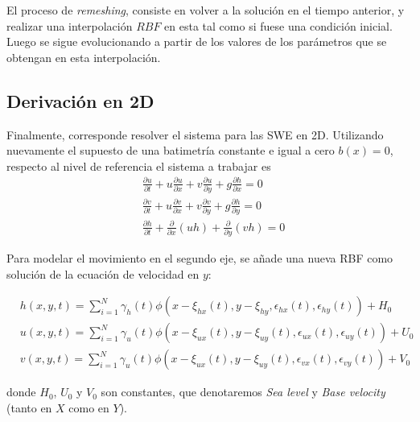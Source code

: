 ﻿\documentclass[spanish]{article}
\begin{document}
    El proceso de \textit{remeshing}, consiste en volver a la solución en el tiempo anterior, y realizar una interpolación $RBF$ en esta tal como si fuese una condición inicial. Luego se sigue evolucionando a partir de los valores de los parámetros que se obtengan en esta interpolación.


\subsection{Derivación en 2D}

    Finalmente, corresponde resolver el sistema para las SWE en 2D. Utilizando nuevamente el supuesto de una batimetría constante e igual a cero $b(x)=0$, respecto al nivel de referencia el sistema a trabajar es
\begin{align}
 & \frac{\partial u}{\partial t} + u \frac{\partial u}{\partial x} + v \frac{\partial u}{\partial y} + g \frac{\partial h}{\partial x} = 0 \label{eq:xcontinuity}\\
 & \frac{\partial v}{\partial t} + u \frac{\partial v}{\partial x} + v \frac{\partial v}{\partial y} + g \frac{\partial h}{\partial y} = 0 \label{eq:ycontinuity}\\
 & \frac{\partial h}{\partial t} + \frac{\partial }{\partial x}(uh) + \frac{\partial }{\partial y}(vh) = 0 \label{eq:momentum2}
\end{align}

    Para modelar el movimiento en el segundo eje, se añade una nueva RBF como solución de la ecuación de velocidad en $y$:

\begin{align}
     & h(x,y,t) = \sum_{i=1}^{N} \gamma_h(t)\phi(x-\xi_{hx}(t),y-\xi_{hy},\epsilon_{hx}(t),\epsilon_{hy}(t)) + H_0 \label{eq:happ2}\\
     & u(x,y,t) = \sum_{i=1}^{N} \gamma_u(t)\phi(x-\xi_{ux}(t),y-\xi_{uy}(t),\epsilon_{ux}(t),\epsilon_{uy}(t)) + U_0 \label{eq:uapp2}\\
     & v(x,y,t) = \sum_{i=1}^{N} \gamma_u(t)\phi(x-\xi_{ux}(t),y-\xi_{uy}(t),\epsilon_{vx}(t),\epsilon_{vy}(t)) + V_0 \label{eq:vapp2}
 \end{align}

     donde $H_0$, $U_0$ y $V_0$ son constantes, que denotaremos \textit{Sea level} y \textit{Base velocity} (tanto en $X$ como en $Y$).
\end{document}
